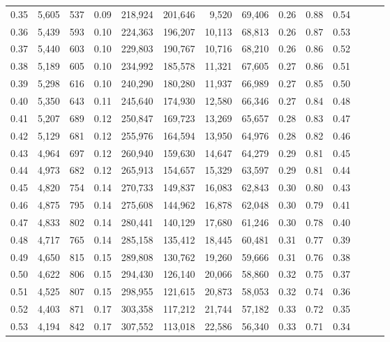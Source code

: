 \begin{tabular}{rrrrrrrrrrrrrr}
0.35 &  5,605 &    537 &  0.09 &  218,924 &  201,646 &   9,520 &  69,406 &  0.26 &  0.88 &      0.54 \\
0.36 &  5,439 &    593 &  0.10 &  224,363 &  196,207 &  10,113 &  68,813 &  0.26 &  0.87 &      0.53 \\
0.37 &  5,440 &    603 &  0.10 &  229,803 &  190,767 &  10,716 &  68,210 &  0.26 &  0.86 &      0.52 \\
0.38 &  5,189 &    605 &  0.10 &  234,992 &  185,578 &  11,321 &  67,605 &  0.27 &  0.86 &      0.51 \\
0.39 &  5,298 &    616 &  0.10 &  240,290 &  180,280 &  11,937 &  66,989 &  0.27 &  0.85 &      0.50 \\
0.40 &  5,350 &    643 &  0.11 &  245,640 &  174,930 &  12,580 &  66,346 &  0.27 &  0.84 &      0.48 \\
0.41 &  5,207 &    689 &  0.12 &  250,847 &  169,723 &  13,269 &  65,657 &  0.28 &  0.83 &      0.47 \\
0.42 &  5,129 &    681 &  0.12 &  255,976 &  164,594 &  13,950 &  64,976 &  0.28 &  0.82 &      0.46 \\
0.43 &  4,964 &    697 &  0.12 &  260,940 &  159,630 &  14,647 &  64,279 &  0.29 &  0.81 &      0.45 \\
0.44 &  4,973 &    682 &  0.12 &  265,913 &  154,657 &  15,329 &  63,597 &  0.29 &  0.81 &      0.44 \\
0.45 &  4,820 &    754 &  0.14 &  270,733 &  149,837 &  16,083 &  62,843 &  0.30 &  0.80 &      0.43 \\
0.46 &  4,875 &    795 &  0.14 &  275,608 &  144,962 &  16,878 &  62,048 &  0.30 &  0.79 &      0.41 \\
0.47 &  4,833 &    802 &  0.14 &  280,441 &  140,129 &  17,680 &  61,246 &  0.30 &  0.78 &      0.40 \\
0.48 &  4,717 &    765 &  0.14 &  285,158 &  135,412 &  18,445 &  60,481 &  0.31 &  0.77 &      0.39 \\
0.49 &  4,650 &    815 &  0.15 &  289,808 &  130,762 &  19,260 &  59,666 &  0.31 &  0.76 &      0.38 \\
0.50 &  4,622 &    806 &  0.15 &  294,430 &  126,140 &  20,066 &  58,860 &  0.32 &  0.75 &      0.37 \\
0.51 &  4,525 &    807 &  0.15 &  298,955 &  121,615 &  20,873 &  58,053 &  0.32 &  0.74 &      0.36 \\
0.52 &  4,403 &    871 &  0.17 &  303,358 &  117,212 &  21,744 &  57,182 &  0.33 &  0.72 &      0.35 \\
0.53 &  4,194 &    842 &  0.17 &  307,552 &  113,018 &  22,586 &  56,340 &  0.33 &  0.71 &      0.34 \\

\end{tabular}
